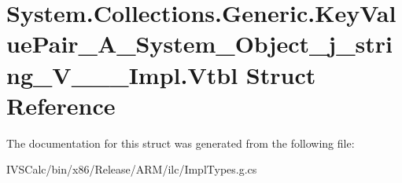 \hypertarget{struct_system_1_1_collections_1_1_generic_1_1_key_value_pair___a___system___object__j__string___v_______impl_1_1_vtbl}{}\section{System.\+Collections.\+Generic.\+Key\+Value\+Pair\+\_\+\+A\+\_\+\+System\+\_\+\+Object\+\_\+j\+\_\+string\+\_\+\+V\+\_\+\+\_\+\+\_\+\+Impl.\+Vtbl Struct Reference}
\label{struct_system_1_1_collections_1_1_generic_1_1_key_value_pair___a___system___object__j__string___v_______impl_1_1_vtbl}


The documentation for this struct was generated from the following file\+:\begin{DoxyCompactItemize}
\item 
I\+V\+S\+Calc/bin/x86/\+Release/\+A\+R\+M/ilc/Impl\+Types.\+g.\+cs\end{DoxyCompactItemize}
